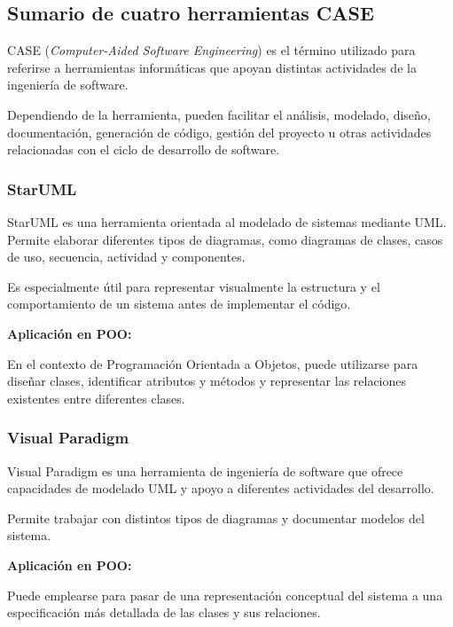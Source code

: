 \documentclass[12pt,a4paper]{article}
\begin{document}

\subsection{Sumario de cuatro herramientas CASE}

CASE (\textit{Computer-Aided Software Engineering}) es el término
utilizado para referirse a herramientas informáticas que apoyan
distintas actividades de la ingeniería de software.

Dependiendo de la herramienta, pueden facilitar el análisis,
modelado, diseño, documentación, generación de código, gestión del
proyecto u otras actividades relacionadas con el ciclo de desarrollo
de software.

\subsubsection{StarUML}

StarUML es una herramienta orientada al modelado de sistemas
mediante UML. Permite elaborar diferentes tipos de diagramas, como
diagramas de clases, casos de uso, secuencia, actividad y
componentes.

Es especialmente útil para representar visualmente la estructura y
el comportamiento de un sistema antes de implementar el código.

\textbf{Aplicación en POO:}

En el contexto de Programación Orientada a Objetos, puede utilizarse
para diseñar clases, identificar atributos y métodos y representar
las relaciones existentes entre diferentes clases.

\subsubsection{Visual Paradigm}

Visual Paradigm es una herramienta de ingeniería de software que
ofrece capacidades de modelado UML y apoyo a diferentes actividades
del desarrollo.

Permite trabajar con distintos tipos de diagramas y documentar
modelos del sistema.

\textbf{Aplicación en POO:}

Puede emplearse para pasar de una representación conceptual del
sistema a una especificación más detallada de las clases y sus
relaciones.
\end{document}
